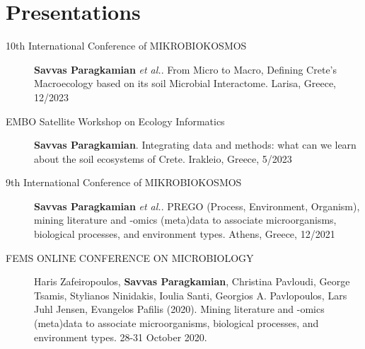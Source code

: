 \section{Presentations}
  \begin{description}
      \item[10th International Conference of MIKROBIOKOSMOS] \textbf{Savvas Paragkamian} \textit{et al.}.
From Micro to Macro, Defining Crete's Macroecology based on its soil Microbial Interactome.
Larisa, Greece, 12/2023

\item[EMBO Satellite Workshop on Ecology Informatics] \textbf{Savvas Paragkamian}.
    Integrating data and methods: what can we learn about the soil ecosystems of Crete.
Irakleio, Greece, 5/2023

\item[9th International Conference of MIKROBIOKOSMOS] \textbf{Savvas Paragkamian} \textit{et al.}. 
PREGO (Process, Environment, Organism), mining literature and -omics (meta)data to associate microorganisms, biological processes, and environment types. 
Athens, Greece, 12/2021
%


\item[FEMS ONLINE CONFERENCE ON MICROBIOLOGY] Haris Zafeiropoulos, \textbf{Savvas Paragkamian}, Christina Pavloudi, George Tsamis, Stylianos Ninidakis, Ioulia Santi,  Georgios A. Pavlopoulos, Lars Juhl Jensen, Evangelos Pafilis (2020). Mining literature and -omics (meta)data to associate microorganisms, biological processes, and environment types. 28-31 October 2020.


\end{description}
